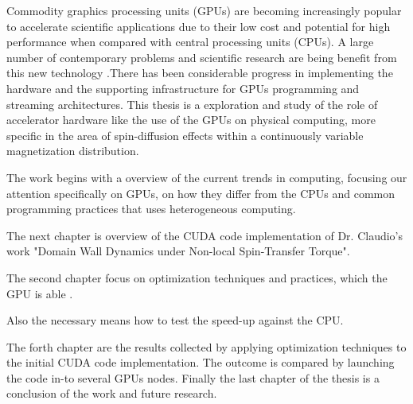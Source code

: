 \documentclass[11pt, oneside, a4paper]{Thesis} %
\begin{document}
\pagestyle{fancy} %

\tableofcontents %

\listoffigures %





\introductions

\bigskip

Commodity graphics processing units (GPUs) are becoming increasingly popular to accelerate scientific applications due to their low cost and potential for high performance when compared with central processing units (CPUs). A large number of contemporary problems and scientific research are being benefit from this new technology .There has been considerable progress in implementing the hardware and the supporting infrastructure for GPUs programming and streaming architectures. This thesis is a exploration and study of the role of accelerator hardware like the use of the GPUs on physical computing, more specific in the area of spin-diffusion effects within a continuously variable magnetization distribution.

The work begins with a overview of the current trends in computing, focusing our attention specifically on GPUs, on how they differ from the CPUs and common programming practices that uses heterogeneous computing. 


The next chapter is overview of the CUDA code implementation of Dr. Claudio's work "Domain Wall Dynamics under Non-local Spin-Transfer Torque". 


The second chapter focus on optimization techniques and practices, which the GPU is able .

 Also the necessary means how to test the speed-up against the CPU. 
 
 The forth chapter are the results collected by applying optimization techniques to the initial CUDA code implementation. The outcome is compared by launching the code in-to several GPUs nodes. Finally the last chapter of the thesis is a conclusion of the work and future research.
\end{document}
